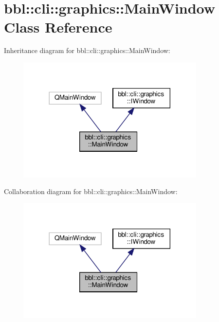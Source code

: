 \hypertarget{classbbl_1_1cli_1_1graphics_1_1_main_window}{}\section{bbl\+:\+:cli\+:\+:graphics\+:\+:Main\+Window Class Reference}
\label{classbbl_1_1cli_1_1graphics_1_1_main_window}


Inheritance diagram for bbl\+:\+:cli\+:\+:graphics\+:\+:Main\+Window\+:
\nopagebreak
\begin{figure}[H]
\begin{center}
\leavevmode
\includegraphics[width=266pt]{classbbl_1_1cli_1_1graphics_1_1_main_window__inherit__graph}
\end{center}
\end{figure}


Collaboration diagram for bbl\+:\+:cli\+:\+:graphics\+:\+:Main\+Window\+:
\nopagebreak
\begin{figure}[H]
\begin{center}
\leavevmode
\includegraphics[width=266pt]{classbbl_1_1cli_1_1graphics_1_1_main_window__coll__graph}
\end{center}
\end{figure}

